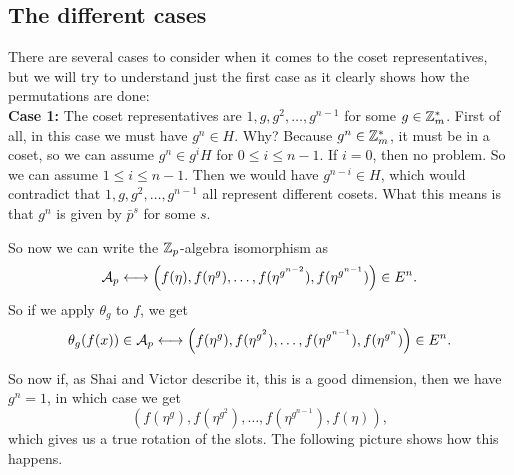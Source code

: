 \documentclass[12pt]{article}
\theoremstyle{plain}
\theoremstyle{definition}
\theoremstyle{remark}
\begin{document}
\subsection{The different cases}
There are several cases to consider when it comes to the coset representatives, but we will try to understand just the first case as it clearly shows how the permutations are done:
\\
{\bf Case 1:} The coset representatives are $1, g, g^2, \dots, g^{n-1}$ for some $g \in \mathbb{Z}_m^*$. First of all, in this case we must have $g^n\in H$. Why? Because $g^n\in \mathbb{Z}_m^*$, it must be in a coset, so we can assume $g^n\in g^iH$ for $0\leq i\leq n-1$. If $i=0$, then no problem. So we can assume $1\leq i\leq n-1$. Then we would have $g^{n-i} \in H$, which would contradict that $1, g, g^2, \dots, g^{n-1}$ all represent different cosets. What this means is that $g^n$ is given by $\bar{p}^s$ for some $s$. 

So now we can write the $\mathbb{Z}_p$-algebra isomorphism as 
$$\mathcal{A}_p \longleftrightarrow \left (f(\eta), f(\eta^g), \dots, f(\eta^{g^{n-2}}), f(\eta^{g^{n-1}})\right ) \in E^n.$$
So if we apply $\theta_g$ to $f$, we get 
$$\theta_g(f(x))\in \mathcal{A}_p \longleftrightarrow \left (f(\eta^g), f(\eta^{g^2}), \dots, f(\eta^{g^{n-1}}), f(\eta^{g^{n}})\right ) \in E^n. $$

So now if, as Shai and Victor describe it, this is a good dimension, then we have $g^n=1$, in which case we get $$ \left (f(\eta^g), f(\eta^{g^2}), \dots, f(\eta^{g^{n-1}}), f(\eta)\right ),$$
which gives us a true rotation of the slots. 
The following picture shows how this happens. 

\bigskip
\end{document}
